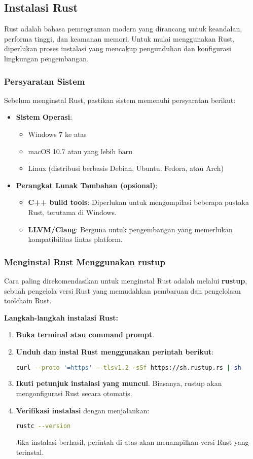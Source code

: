 \subsection{Instalasi Rust}

Rust adalah bahasa pemrograman modern yang dirancang untuk keandalan, performa tinggi, dan keamanan memori. Untuk mulai menggunakan Rust, diperlukan proses instalasi yang mencakup pengunduhan dan konfigurasi lingkungan pengembangan.

\subsubsection{Persyaratan Sistem}
Sebelum menginstal Rust, pastikan sistem memenuhi persyaratan berikut:
\begin{itemize}
	\item \textbf{Sistem Operasi}:
	\begin{itemize}
		\item Windows 7 ke atas
		\item macOS 10.7 atau yang lebih baru
		\item Linux (distribusi berbasis Debian, Ubuntu, Fedora, atau Arch)
	\end{itemize}
	\item \textbf{Perangkat Lunak Tambahan (opsional)}:
	\begin{itemize}
		\item \textbf{C++ build tools}: Diperlukan untuk mengompilasi beberapa pustaka Rust, terutama di Windows.
		\item \textbf{LLVM/Clang}: Berguna untuk pengembangan yang memerlukan kompatibilitas lintas platform.
	\end{itemize}
\end{itemize}

\subsubsection{Menginstal Rust Menggunakan rustup}
Cara paling direkomendasikan untuk menginstal Rust adalah melalui \textbf{rustup}, sebuah pengelola versi Rust yang memudahkan pembaruan dan pengelolaan toolchain Rust.

\textbf{Langkah-langkah instalasi Rust:}
\begin{enumerate}
	\item \textbf{Buka terminal atau command prompt}.
	\item \textbf{Unduh dan instal Rust menggunakan perintah berikut}:
	\begin{lstlisting}[language=Bash]
		curl --proto '=https' --tlsv1.2 -sSf https://sh.rustup.rs | sh
	\end{lstlisting}
	\item \textbf{Ikuti petunjuk instalasi yang muncul}. Biasanya, rustup akan mengonfigurasi Rust secara otomatis.
	\item \textbf{Verifikasi instalasi} dengan menjalankan:
	\begin{lstlisting}[language=Bash]
		rustc --version
	\end{lstlisting}
	Jika instalasi berhasil, perintah di atas akan menampilkan versi Rust yang terinstal.
\end{enumerate}

